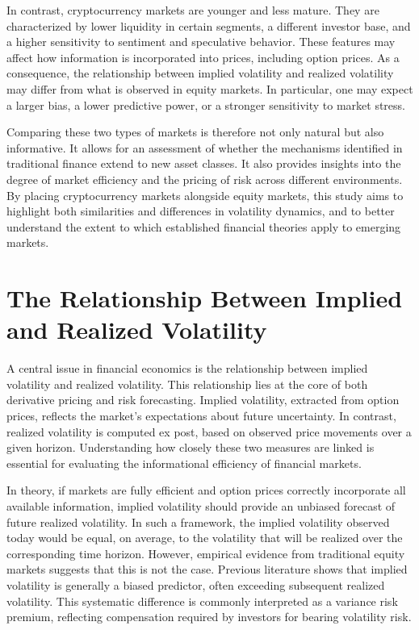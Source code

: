\documentclass[11pt,a4paper,openany]{report}
\begin{document}
In contrast, cryptocurrency markets are younger and less mature. They
are characterized by lower liquidity in certain segments, a different
investor base, and a higher sensitivity to sentiment and speculative
behavior. These features may affect how information is incorporated into
prices, including option prices. As a consequence, the relationship
between implied volatility and realized volatility may differ from what
is observed in equity markets. In particular, one may expect a larger
bias, a lower predictive power, or a stronger sensitivity to market
stress.

Comparing these two types of markets is therefore not only natural but
also informative. It allows for an assessment of whether the mechanisms
identified in traditional finance extend to new asset classes. It also
provides insights into the degree of market efficiency and the pricing
of risk across different environments. By placing cryptocurrency markets
alongside equity markets, this study aims to highlight both similarities
and differences in volatility dynamics, and to better understand the
extent to which established financial theories apply to emerging
markets.

\section{The Relationship Between Implied and Realized
Volatility}\label{the-relationship-between-implied-and-realized-volatility}

A central issue in financial economics is the relationship between
implied volatility and realized volatility. This relationship lies at
the core of both derivative pricing and risk forecasting. Implied
volatility, extracted from option prices, reflects the market's
expectations about future uncertainty. In contrast, realized volatility
is computed ex post, based on observed price movements over a given
horizon. Understanding how closely these two measures are linked is
essential for evaluating the informational efficiency of financial
markets.

In theory, if markets are fully efficient and option prices correctly
incorporate all available information, implied volatility should provide
an unbiased forecast of future realized volatility. In such a framework,
the implied volatility observed today would be equal, on average, to the
volatility that will be realized over the corresponding time horizon.
However, empirical evidence from traditional equity markets suggests
that this is not the case. Previous literature shows that implied
volatility is generally a biased predictor, often exceeding subsequent
realized volatility. This systematic difference is commonly interpreted
as a variance risk premium, reflecting compensation required by
investors for bearing volatility risk.
\end{document}
